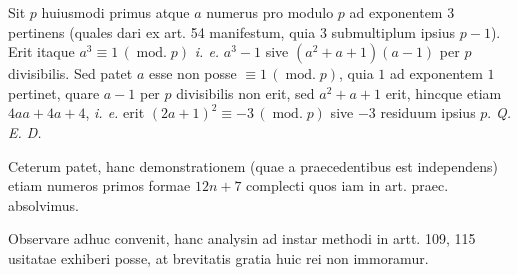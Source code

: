 Sit $p$ huiusmodi primus atque $a$ numerus pro modulo $p$ ad exponentem $3$ pertinens (quales dari ex art. 54 manifestum, quia $3$ submultiplum ipsius $p-1$). Erit itaque $a^3\equiv1\,(\operatorname{mod.}p)$ \emph{i. e.} $a^3-1$ sive $(a^2+a+1)(a-1)$ per $p$ divisibilis. Sed patet $a$ esse non posse $\equiv1\,(\operatorname{mod.}p)$, quia $1$ ad exponentem $1$ pertinet, quare $a-1$ per $p$ divisibilis non erit, sed $a^2+a+1$ erit, hincque etiam $4aa+4a+4$, \emph{i. e.} erit $(2a+1)^2\equiv-3\,(\operatorname{mod.}p)$ sive $-3$ residuum ipsius $p$. \emph{Q. E. D.}

Ceterum patet, hanc demonstrationem (quae a praecedentibus est independens) etiam numeros primos formae $12n+7$ complecti quos iam in art. praec. absolvimus.

Observare adhuc convenit, hanc analysin ad instar methodi in artt. 109, 115 usitatae exhiberi posse, at brevitatis gratia huic rei non immoramur.
